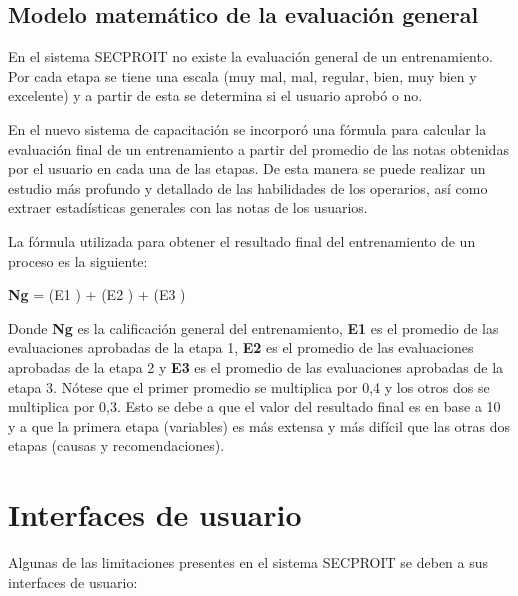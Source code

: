 \subsection{Modelo matemático de la evaluación general}
En el sistema SECPROIT no existe la evaluación general de un entrenamiento. Por cada etapa se tiene una escala (muy mal, mal, regular, bien, muy bien y excelente) y a partir de esta se determina si el usuario aprobó o no.

En el nuevo sistema de capacitación se incorporó una fórmula para calcular la evaluación final de un entrenamiento a partir del promedio de las notas obtenidas por el usuario en cada una de las etapas. De esta manera se puede realizar un estudio más profundo y detallado de las habilidades de los operarios, así como extraer estadísticas generales con las notas de los usuarios.

La fórmula utilizada para obtener el resultado final del entrenamiento de un proceso es la siguiente:

\vspace{0.15cm}
\begin{center}
\begin{Large}
\textbf{Ng} = (E1 ) + (E2 ) + (E3 )
\end{Large}
\end{center}
\vspace{0.15cm}

Donde \textbf{Ng} es la calificación general del entrenamiento, \textbf{E1} es el promedio de las evaluaciones aprobadas de la etapa 1, \textbf{E2} es el promedio de las evaluaciones aprobadas de la etapa 2 y \textbf{E3} es el promedio de las evaluaciones aprobadas de la etapa 3. Nótese que el primer promedio se multiplica por 0,4 y los otros dos se multiplica por 0,3. Esto se debe a que el valor del resultado final es en base a 10 y a que la primera etapa (variables) es más extensa y más difícil que las otras dos etapas (causas y recomendaciones).

\section{Interfaces de usuario}
Algunas de las limitaciones presentes en el sistema SECPROIT se deben a sus interfaces de usuario:


